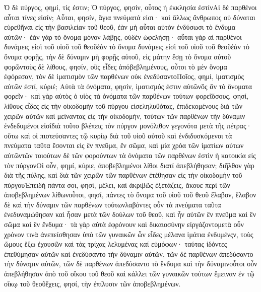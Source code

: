 Ὁ δὲ πύργος, φημί, τίς ἐστιν; Ὁ πύργος, φησίν, οὗτος ἡ ἐκκλησία ἐστίνΑἱ δὲ παρθένοι αὗται τίνες εἰσίν; Αὗται, φησίν, ἅγια πνεύματά εἰσι· καὶ ἄλλως ἄνθρωπος οὐ δύναται εὑρεθῆναι εἰς τὴν βασιλείαν τοῦ θεοῦ, ἐὰν μὴ αὗται αὐτὸν ἐνδύσωσι τὸ ἔνδυμα αὐτῶν· ἐὰν γὰρ τὸ ὄνομα μόνον λάβῃς, οὐδὲν ὠφελήσῃ· αὗται γὰρ αἱ παρθένοι δυνάμεις εἰσὶ τοῦ υἱοῦ τοῦ θεοῦἐὰν τὸ ὄνομα δυνάμεις εἰσὶ τοῦ υἱοῦ τοῦ θεοῦἐὰν τὸ ὄνομα φορῇς, τὴν δὲ δύναμιν μὴ φορῇς αὐτοῦ, εἰς μάτην ἔσῃ τὸ ὄνομα αὐτοῦ φορῶντοὺς δὲ λίθους, φησίν, οὓς εἶδες ἀπόβεβλημένους, οὗτοι τὸ μὲν ὄνομα ἐφόρεσαν, τὸν δὲ ἱματισμὸν τῶν παρθένων οὐκ ἐνεδύσαντοΠοῖος, φημί, ἱματισμὸς αὐτῶν ἐστί, κύριέ; Αὐτὰ τὰ ὀνόματα, φησίν, ἱματισμός ἐστιν αὐτῶνὃς ἂν τὸ ὄνοματα φορεῖν· καὶ γὰρ αὐτὸς ὁ υἱὸς τὰ ὀνόματα τῶν παρθένων τούτων φορεῖὅσους, φησί, λίθους εἶδες εἰς τὴν οἰκοδομὴν τοῦ πύργου εἰσεληλυθότας, ἐπιδεκομένους διὰ τῶν χειρῶν αὐτῶν καὶ μείναντας εἰς τὴν οἰκοδομήν, τούτων τῶν παρθένων τὴν δύναμιν ἐνδεδυμένοι εἰσίδιὰ τοῦτο βλέπεις τὸν πύργον μονόλιθον γεγονότα μετὰ τῆς πέτρας· οὕτω καὶ οἱ πιστεύσαντες τῷ κυρίῳ διὰ τοῦ υἱοῦ αὐτοῦ καὶ ἐνδιδυσκόμενοι τὰ πνεύματα ταῦτα ἔσονται εἰς ἓν πνεῦμα, ἓν σῶμα, καὶ μία χρόα τῶν ἱματίων αὐτων αὐτῶντῶν τοιούτων δὲ τῶν φορούντων τὰ ὀνόματα τῶν παρθένων ἐστὶν ἡ κατοικία εἰς τὸν πύργονΟἱ οὖν, φημί, κύριε, ἀποβεβλημένοι λίθοι διατί ἀπεβλήθησαν; διῆλθον γὰρ διὰ τῆς πύλης, καὶ διὰ τῶν χειρῶν τῶν παρθένων ἐτέθησαν εἰς τὴν οἰκοδομὴν τοῦ πύργουἘπειδὴ πάντα σοι, φησί, μέλει, καὶ ἀκριβῶς ἐξετάζεις, ἄκουε περὶ τῶν ἀποβεβλημένων λίθωνοὗτοι, φησί, πάντες τὸ ὄνομα τοῦ υἱοῦ τοῦ θεοῦ ἔλαβον, ἔλαβον δὲ καὶ τὴν δύναμιν τῶν παρθένων τούτωνλαβόντες οὖν τὰ πνεύματα ταῦτα ἐνεδυναμώθησαν καὶ ἦσαν μετὰ τῶν δούλων τοῦ θεοῦ, καὶ ἦν αὐτῶν ἓν πνεῦμα καὶ ἓν σῶμα καὶ ἓν ἔνδυμα· τὰ γὰρ αὐτὰ ἐφρόνουν καὶ δικαιοσύνην εἰργάζοντομετὰ οὖν χρόνον τινὰ ἀνεπείσθησαν ὑπὸ τῶν γυναικῶν ὧν εἶδες μέλανα ἱμάτια ἐνδυμένςν, τοὺς ὤμους ἔξω ἐχουσῶν καὶ τὰς τρίχας λελυμένας καί εὐμόφων· ταύτας ἰδόντες ἐπεθύμησαν αὐτῶν καὶ ἐνεδύσαντο τὴν δύναμιν αὐτῶν, τῶν δὲ παρθένων ἀπεδύσαντο τὴν δύναμιν αὐτῶν, τῶν δὲ παρθένων ἀπεδύσαντο τὸ ἔνδυμα καὶ τὴν δύναμινοὗτοι οὖν ἀπεβλήθησαν ἀπὸ τοῦ οἴκου τοῦ θεοῦ καὶ κάλλει τῶν γυναικῶν τούτων ἔμειναν ἐν τῷ οἴκῳ τοῦ θεοῦἔχεις, φησί, τὴν ἐπίλυσιν τῶν ἀποβεβλημένων.
